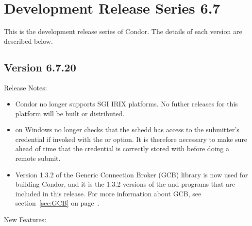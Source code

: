 \section{\label{sec:History-6-7}Development Release Series 6.7}

This is the development release series of Condor.
The details of each version are described below.


\subsection*{\label{sec:New-6-7-20}Version 6.7.20}

\noindent Release Notes:

\begin{itemize}

\item Condor no longer supports SGI IRIX platforms.  No futher
releases for this platform will be built or distributed.

\item {} on Windows no longer checks that the schedd has
access to the submitter's credential if invoked with the  or
 option. It is therefore necessary to make sure ahead of time
that the credential is correctly stored with 
before doing a remote submit.

\item Version 1.3.2 of the Generic Connection Broker (GCB) library is
  now used for building Condor, and it is the 1.3.2 versions of the
   and  programs that are
  included in this release.
  For more information about GCB, see section~\ref{sec:GCB} on
  page~\pageref{sec:GCB}. 

\end{itemize}


\noindent New Features:

